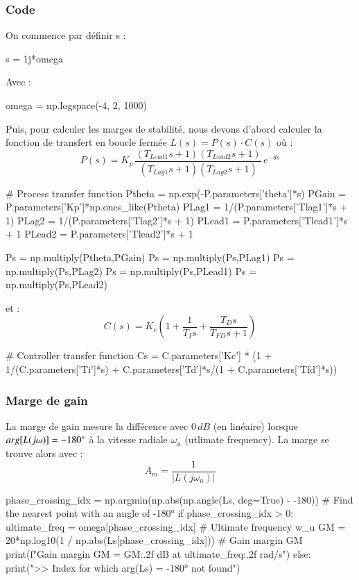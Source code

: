 \subsubsection{Code}
On commence par définir s : 
\begin{python*}
    s = 1j*omega
\end{python*}
Avec : 
\begin{python*}
    omega = np.logspace(-4, 2, 1000)
\end{python*}
Puis, pour calculer les marges de stabilité, nous devons d'abord calculer la fonction de transfert en boucle fermée $L(s) = P(s)\cdot C(s)$ où :
\begin{equation}
    P(s) = K_p\,\frac{(T_{Lead1}s +1)(T_{Lead2}s +1)}{(T_{Lag1}s +1)(T_{Lag2}s +1)}\,e^{-\theta s}
\end{equation}
\begin{python*}
    # Process transfer function
    Ptheta = np.exp(-P.parameters['theta']*s)
    PGain = P.parameters['Kp']*np.ones_like(Ptheta)
    PLag1 = 1/(P.parameters['Tlag1']*s + 1)
    PLag2 = 1/(P.parameters['Tlag2']*s + 1)
    PLead1 = P.parameters['Tlead1']*s + 1
    PLead2 = P.parameters['Tlead2']*s + 1

    Ps = np.multiply(Ptheta,PGain)
    Ps = np.multiply(Ps,PLag1)
    Ps = np.multiply(Ps,PLag2)
    Ps = np.multiply(Ps,PLead1)
    Ps = np.multiply(Ps,PLead2)
\end{python*}
et :
\begin{equation}\label{eq:Cs}
    C(s)=K_c(1+\frac{1}{T_Is}+\frac{T_Ds}{T_{FD}s +1})
\end{equation}
\begin{python*}
    # Controller transfer function
    Cs = C.parameters['Kc'] * (1 + 1/(C.parameters['Ti']*s) + C.parameters['Td']*s/(1 + C.parameters['Tfd']*s))
\end{python*}

\subsubsection{Marge de gain}
La marge de gain mesure la différence avec $0\,dB$ (en linéaire) lorsque $arg[L(j\omega)] = -180\degree$ à la vitesse radiale $\omega_u$ (utlimate frequency).
La marge se trouve alors avec :
\[A_m = \frac{1}{|L(j\omega_u)|}\]
\begin{python*}
    phase_crossing_idx = np.argmin(np.abs(np.angle(Ls, deg=True) - -180)) # Find the nearest point with an angle of -180°
    if phase_crossing_idx > 0:
        ultimate_freq = omega[phase_crossing_idx] # Ultimate frequency w_u 
        GM = 20*np.log10(1 / np.abs(Ls[phase_crossing_idx])) # Gain margin GM
        print(f"Gain margin GM = {GM:.2f} dB at {ultimate_freq:.2f} rad/s")
    else:
        print(">> Index for which arg(Ls) = -180° not found")
\end{python*}

